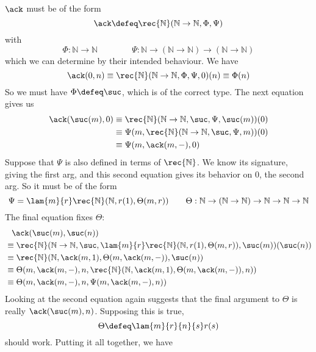     \soln 
    $\ack$ must be of the form
    \[
    \ack \defeq 
    \rec{\mathbb{N}}(\mathbb{N} \to \mathbb{N}, \Phi, \Psi)
    \]
    with
        \[
        \Phi : \mathbb{N} \to \mathbb{N}
        \qquad\qquad
        \Psi : \mathbb{N} \to (\mathbb{N} \to \mathbb{N}) \to (\mathbb{N} \to
        \mathbb{N})
        \]
        which we can determine by their intended behaviour.  We have
        \[
        \ack(0, n)
        \equiv
        \rec{\mathbb{N}}(\mathbb{N} \to \mathbb{N}, \Phi, \Psi, 0)(n)
        \equiv
        \Phi(n)
        \]
        So we must have $\Phi \defeq \suc$, which is of the correct type.  The next
        equation gives us
        \begin{align*}
        \ack(\suc(m), 0)
        &\equiv
        \rec{\mathbb{N}}(\mathbb{N} \to \mathbb{N}, \suc, \Psi, \suc(m))(0)
        \\&\equiv
        \Psi(m, \rec{\mathbb{N}}(\mathbb{N} \to \mathbb{N}, \suc, \Psi, m))(0)
        \\&\equiv
        \Psi(m, \ack(m, -), 0)
        \end{align*}
    Suppose that $\Psi$ is also defined in terms of $\rec{\mathbb{N}}$.  We know
    its signature, giving the first arg, and this second equation gives its
    behavior on $0$, the second arg.  So it must be of the form
    \[
    \Psi = 
    \lam{m}{r} \rec{\mathbb{N}}(\mathbb{N}, r(1), \Theta(m, r))
    \qquad
    \Theta : \mathbb{N} \to (\mathbb{N} \to \mathbb{N}) \to \mathbb{N} \to \mathbb{N} \to \mathbb{N}
    \]
    The final equation fixes $\Theta$:
    \begin{align*}
    &\phantom{\equiv} \ack(\suc(m), \suc(n))
    \\&\equiv
    \rec{\mathbb{N}}(\mathbb{N} \to \mathbb{N}, \suc, 
    \lam{m}{r} \rec{\mathbb{N}}(\mathbb{N}, r(1), \Theta(m, r)),
    \suc(m))(\suc(n))
    \\&\equiv
    \rec{\mathbb{N}}(\mathbb{N}, \ack(m, 1), \Theta(m, \ack(m, -)), \suc(n))
    \\&\equiv
    \Theta(m, \ack(m, -), n, 
    \rec{\mathbb{N}}(\mathbb{N}, \ack(m, 1), \Theta(m, \ack(m, -)), n)
    )
    \\&\equiv
    \Theta(m, \ack(m, -), n, 
    \Psi(m, \ack(m, -), n)
    )
    \end{align*}
    Looking at the second equation again suggests that the final argument to
    $\Theta$ is really $\ack(\suc(m), n)$.  Supposing this is true,
    \[
    \Theta \defeq \lam{m}{r}{n}{s}r(s)
    \]
    should work.  Putting it all together, we have
